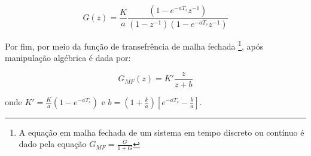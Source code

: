         \begin{equation}
            G(z) = \frac{K}{a} \frac{(1 - e^{-aT_s}z^{-1})}{(1-z^{-1})(1 - e^{-aT_s}z^{-1})}
        \end{equation}
    
    Por fim, por meio da função de transefrência de malha fechada \footnote{A equação em malha fechada de um sistema em tempo discreto ou contínuo é dado pela equação $G_{MF} = \frac{G}{1+G}$}, após manipulação algébrica é dada por:
    
        \begin{equation}
            G_{MF}(z) = K' \frac{z}{z+b}
        \end{equation}
        
    onde $K' = \frac{K}{a} (1-e^{-aT_s}) \mbox{ e } b = (1 + \frac{k}{a})\left[e^{-aT_s} - \frac{k}{a} \right] $.
